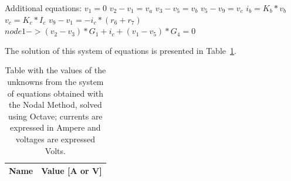 Additional equations:
$v_1= 0$
$v_2 - v_1 = v_a$
$v_3 - v_5 = v_b$
$v_5 - v_9 = v_c$
$i_b = K_b*v_b$
$v_c = K_c*I_c$
$v_9 - v_1 = -i_c*(r_6 + r_7)$
$node 1 -> (v_2 - v_3)*G_1 + i_c +(v_1 - v_5)*G_4 = 0$

The solution of this system of equations is presented in Table~\ref{tab:nodal}. 

\begin{table}[h]
  \centering
  \begin{tabular}{|l|r|}
    \hline    
    {\bf Name} & {\bf Value [A or V]} \\ \hline
    
  \end{tabular}
  \caption{Table with the values of the unknowns from the system of equations obtained with the Nodal Method, solved using Octave; currents are expressed in Ampere and voltages are expressed Volts.}
  \label{tab:nodal}
\end{table}




